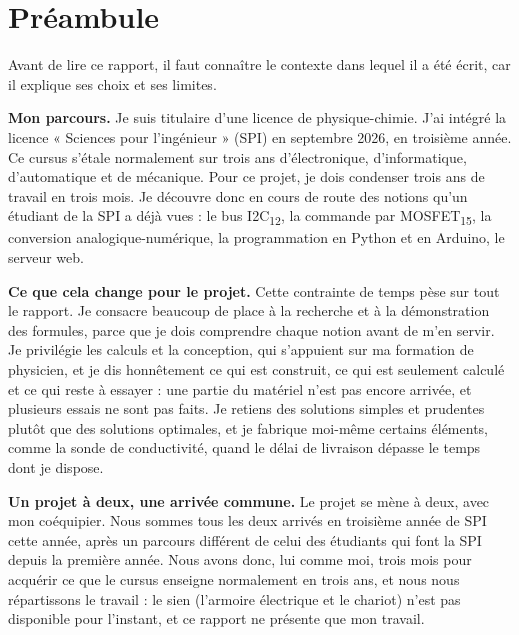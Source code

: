 \documentclass[11pt,a4paper]{article}
\newcommand{\ix}[1]{\textsubscript{#1}}
\begin{document}
\sommaire

\clearpage
\section*{Préambule}

Avant de lire ce rapport, il faut connaître le contexte dans lequel il a été écrit, car il explique ses choix et ses limites.

\textbf{Mon parcours.} Je suis titulaire d'une licence de physique-chimie. J'ai intégré la licence « Sciences pour l'ingénieur » (SPI) en septembre 2026, en troisième année. Ce cursus s'étale normalement sur trois ans d'électronique, d'informatique, d'automatique et de mécanique. Pour ce projet, je dois condenser trois ans de travail en trois mois. Je découvre donc en cours de route des notions qu'un étudiant de la SPI a déjà vues : le bus I2C\ix{12}, la commande par MOSFET\ix{15}, la conversion analogique-numérique, la programmation en Python et en Arduino, le serveur web.

\textbf{Ce que cela change pour le projet.} Cette contrainte de temps pèse sur tout le rapport. Je consacre beaucoup de place à la recherche et à la démonstration des formules, parce que je dois comprendre chaque notion avant de m'en servir. Je privilégie les calculs et la conception, qui s'appuient sur ma formation de physicien, et je dis honnêtement ce qui est construit, ce qui est seulement calculé et ce qui reste à essayer : une partie du matériel n'est pas encore arrivée, et plusieurs essais ne sont pas faits. Je retiens des solutions simples et prudentes plutôt que des solutions optimales, et je fabrique moi-même certains éléments, comme la sonde de conductivité, quand le délai de livraison dépasse le temps dont je dispose.

\textbf{Un projet à deux, une arrivée commune.} Le projet se mène à deux, avec mon coéquipier. Nous sommes tous les deux arrivés en troisième année de SPI cette année, après un parcours différent de celui des étudiants qui font la SPI depuis la première année. Nous avons donc, lui comme moi, trois mois pour acquérir ce que le cursus enseigne normalement en trois ans, et nous nous répartissons le travail : le sien (l'armoire électrique et le chariot) n'est pas disponible pour l'instant, et ce rapport ne présente que mon travail.

\clearpage
\end{document}
